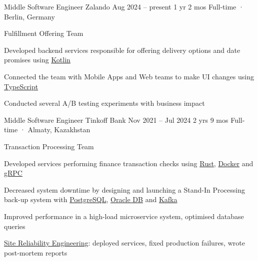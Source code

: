 \documentclass[11pt, a4paper]{style}
\begin{document}
\setcolumnwidth{5.5cm,2.7cm}
\begin{paracol}{2}



    \cvEntry
        {Middle Software Engineer} {Zalando}
        {Aug 2024 -- present} {1 yr 2 mos}
        {Full-time · Berlin, Germany}
        {
            Fulfillment Offering Team \\
            \vspace{-5mm}
            \begin{cvItems}
                \item Developed backend services responsible for offering delivery options and date promises using \underline{Kotlin}
                \item Connected the team with Mobile Apps and Web teams to make UI changes using \underline{TypeScript}
                \item Conducted several A/B testing experiments with business impact
            \end{cvItems}
        }

    \cvEntry
        {Middle Software Engineer} {Tinkoff Bank}
        {Nov 2021 -- Jul 2024} {2 yrs 9 mos}
        {Full-time · Almaty, Kazakhstan}
        {
            Transaction Processing Team \\
            \vspace{-5mm}
            \begin{cvItems}
                \item Developed services performing finance transaction checks using \underline{Rust}, \underline{Docker} and \underline{gRPC}
                \item Decreased system downtime by designing and launching a Stand-In Processing back-up system with \underline{PostgreSQL}, \underline{Oracle DB} and \underline{Kafka}
                \item Improved performance in a high-load microservice system, optimised database queries
                \item \underline{Site Reliability Engineering}: deployed services, fixed production failures, wrote post-mortem reports
            \end{cvItems}
        }


\end{paracol}
\end{document}

